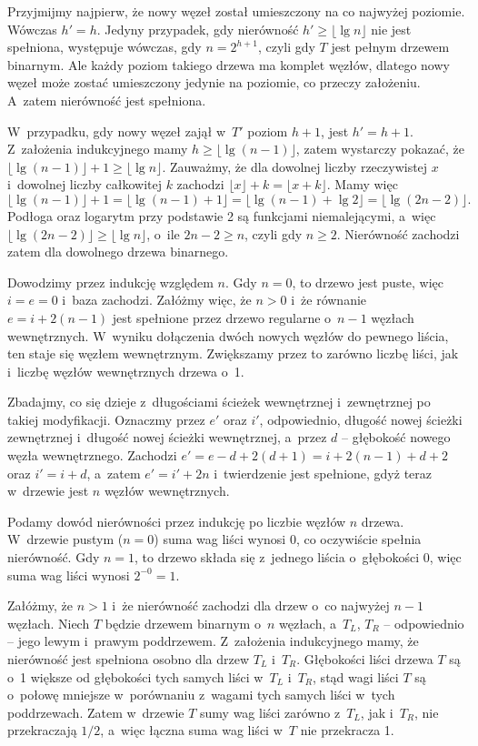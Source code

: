 Przyjmijmy najpierw, że nowy węzeł został umieszczony na co najwyżej  poziomie.
Wówczas $h'=h$.
Jedyny przypadek, gdy nierówność $h'\ge\lfloor\lg n\rfloor$ nie jest spełniona, występuje wówczas, gdy $n=2^{h+1}$, czyli gdy $T$ jest pełnym drzewem binarnym.
Ale każdy poziom takiego drzewa ma komplet węzłów, dlatego nowy węzeł może zostać umieszczony jedynie na  poziomie, co przeczy założeniu.
A~zatem nierówność jest spełniona.

W~przypadku, gdy nowy węzeł zajął w~$T'$ poziom $h+1$, jest $h'=h+1$.
Z~założenia indukcyjnego mamy $h\ge\lfloor\lg(n-1)\rfloor$, zatem wystarczy pokazać, że $\lfloor\lg(n-1)\rfloor+1\ge\lfloor\lg n\rfloor$.
Zauważmy, że dla dowolnej liczby rzeczywistej $x$ i~dowolnej liczby całkowitej $k$ zachodzi $\lfloor x\rfloor+k=\lfloor x+k\rfloor$.
Mamy więc
\[
    \lfloor\lg(n-1)\rfloor+1 = \lfloor\lg(n-1)+1\rfloor = \lfloor\lg(n-1)+\lg2\rfloor = \lfloor\lg(2n-2)\rfloor.
\]
Podłoga oraz logarytm przy podstawie 2 są funkcjami niemalejącymi, a~więc $\lfloor\lg(2n-2)\rfloor\ge\lfloor\lg n\rfloor$, o~ile $2n-2\ge n$, czyli gdy $n\ge2$.
Nierówność zachodzi zatem dla dowolnego drzewa binarnego.

\exercise %
Dowodzimy przez indukcję względem $n$.
Gdy $n=0$, to drzewo jest puste, więc $i=e=0$ i~baza zachodzi.
Załóżmy więc, że $n>0$ i~że równanie $e=i+2(n-1)$ jest spełnione przez drzewo regularne o~$n-1$ węzłach wewnętrznych.
W~wyniku dołączenia dwóch nowych węzłów do pewnego liścia, ten staje się węzłem wewnętrznym.
Zwiększamy przez to zarówno liczbę liści, jak i~liczbę węzłów wewnętrznych drzewa o~1.

Zbadajmy, co się dzieje z~długościami ścieżek wewnętrznej i~zewnętrznej po takiej modyfikacji.
Oznaczmy przez $e'$ oraz $i'$, odpowiednio, długość nowej ścieżki zewnętrznej i~długość nowej ścieżki wewnętrznej, a~przez $d$ -- głębokość nowego węzła wewnętrznego.
Zachodzi $e'=e-d+2(d+1)=i+2(n-1)+d+2$ oraz $i'=i+d$, a~zatem $e'=i'+2n$ i~twierdzenie jest spełnione, gdyż teraz w~drzewie jest $n$ węzłów wewnętrznych.

\exercise %
Podamy dowód nierówności przez indukcję po liczbie węzłów $n$ drzewa.
W~drzewie pustym ($n=0$) suma wag liści wynosi 0, co oczywiście spełnia nierówność.
Gdy $n=1$, to drzewo składa się z~jednego liścia o~głębokości 0, więc suma wag liści wynosi $2^{-0}=1$.

Załóżmy, że $n>1$ i~że nierówność zachodzi dla drzew o~co najwyżej $n-1$ węzłach.
Niech $T$ będzie drzewem binarnym o~$n$ węzłach, a~$T_L$, $T_R$ -- odpowiednio -- jego lewym i~prawym poddrzewem.
Z~założenia indukcyjnego mamy, że nierówność jest spełniona osobno dla drzew $T_L$ i~$T_R$.
Głębokości liści drzewa $T$ są o~1 większe od głębokości tych samych liści w~$T_L$ i~$T_R$, stąd wagi liści $T$ są o~połowę mniejsze w~porównaniu z~wagami tych samych liści w~tych poddrzewach.
Zatem w~drzewie $T$ sumy wag liści zarówno z~$T_L$, jak i~$T_R$, nie przekraczają $1/2$, a~więc łączna suma wag liści w~$T$ nie przekracza 1.

